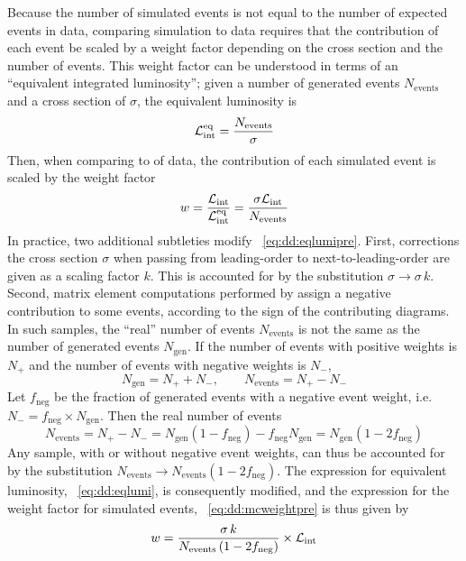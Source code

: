 Because the number of simulated events is not equal to the number of expected events in data, comparing simulation to data requires that the contribution of each event be scaled by a weight factor depending on the cross section and the number of events.
This weight factor can be understood in terms of an ``equivalent integrated luminosity''; given a number of generated events $N_\text{events}$ and a cross section of $\sigma$, the equivalent luminosity is
\begin{equation}
  \mathcal{L}_\mathrm{int}^\text{eq} = \frac{N_\text{events}}{\sigma}
  \label{eq:dd:eqlumi}
\end{equation}
Then, when comparing to \intlumi of data, the contribution of each simulated event is scaled by the weight factor
\begin{equation}
  w = \frac{\mathcal{L}_\mathrm{int}}{\mathcal{L}_\mathrm{int}^\text{eq}} = \frac{\sigma\mathcal{L}_\mathrm{int}}{N_\text{events}}
  \label{eq:dd:mcweightpre}
\end{equation}
In practice, two additional subtleties modify \Eq~\ref{eq:dd:eqlumipre}.
First, corrections the cross section $\sigma$ when passing from leading-order to next-to-leading-order are given as a scaling factor $k$.
This is accounted for by the substitution $\sigma \to \sigma \, k$.
Second, matrix element computations performed by \MGvATNLO assign a negative contribution to some events, according to the sign of the contributing diagrams.
In such samples, the ``real'' number of events $N_\text{events}$ is not the same as the number of generated events $N_\text{gen}$.
If the number of events with positive weights is $N_+$ and the number of events with negative weights is $N_-$,
$$N_{\text{gen}} = N_+ + N_-,\quad\quad N_\text{events} = N_+ - N_-$$
Let $f_\text{neg}$ be the fraction of generated events with a negative event weight, i.e. $N_- = f_\text{neg} \times N_\text{gen}$.
Then the real number of events
\begin{equation}
  N_\text{events} = N_+ - N_- = N_\text{gen}\left(1 - f_\text{neg}\right) - f_\text{neg}N_\text{gen} = N_\text{gen}\left( 1-2f_\text{neg} \right)
  \label{eq:dd:neventsfrac}
\end{equation}
Any sample, with or without negative event weights, can thus be accounted for by the substitution $N_\text{events} \to N_\text{events}\left( 1-2f_\text{neg} \right)$.
The expression for equivalent luminosity, \Eq~\ref{eq:dd:eqlumi}, is consequently modified, and the expression for the weight factor for simulated events, \Eq~\ref{eq:dd:mcweightpre} is thus given by
\begin{equation}
  w = \frac{\sigma\,k}{N_\text{events}\left( 1-2f_\text{neg} \right)} \times \mathcal{L}_\mathrm{int}
  \label{eq:dd:mcweight}
\end{equation}

